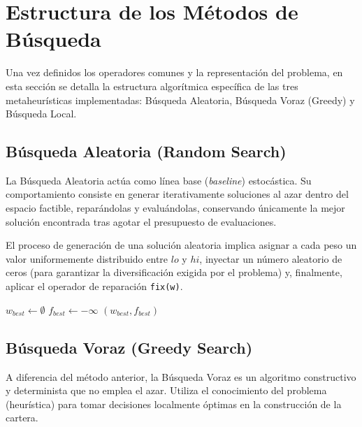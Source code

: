 \newpage
\section{Estructura de los Métodos de Búsqueda}
\label{sec:algoritmos}

Una vez definidos los operadores comunes y la representación del problema, en esta sección se detalla la estructura algorítmica específica de las tres metaheurísticas implementadas: Búsqueda Aleatoria, Búsqueda Voraz (Greedy) y Búsqueda Local.

\subsection{Búsqueda Aleatoria (Random Search)}
La Búsqueda Aleatoria actúa como línea base (\textit{baseline}) estocástica. Su comportamiento consiste en generar iterativamente soluciones al azar dentro del espacio factible, reparándolas y evaluándolas, conservando únicamente la mejor solución encontrada tras agotar el presupuesto de evaluaciones.

El proceso de generación de una solución aleatoria implica asignar a cada peso un valor uniformemente distribuido entre $lo$ y $hi$, inyectar un número aleatorio de ceros (para garantizar la diversificación exigida por el problema) y, finalmente, aplicar el operador de reparación \texttt{fix(w)}.

\begin{algorithm}[H]
\SetAlgoLined
{}
 $w_{best} \leftarrow \emptyset$\;
 $f_{best} \leftarrow -\infty$\;
 \Return $(w_{best}, f_{best})$\;
 \caption{Algoritmo de Búsqueda Aleatoria (Random Search)}
\end{algorithm}

\subsection{Búsqueda Voraz (Greedy Search)}
A diferencia del método anterior, la Búsqueda Voraz es un algoritmo constructivo y determinista que no emplea el azar. Utiliza el conocimiento del problema (heurística) para tomar decisiones localmente óptimas en la construcción de la cartera.

